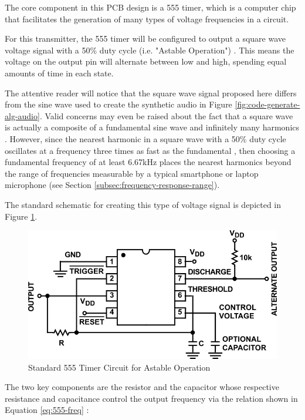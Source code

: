 The core component in this PCB design is a 555 timer, which is a
computer chip that facilitates the generation of many types of voltage
frequencies in a circuit.

For this transmitter, the 555 timer will be configured to output a
square wave voltage signal with a 50\% duty cycle (i.e. "Astable
Operation") \cite{icm7555}. This means the voltage on the output pin
will alternate between low and high, spending equal amounts of time in
each state.

The attentive reader will notice that the square wave signal proposed
here differs from the sine wave used to create the synthetic audio in
Figure \ref{fig:code-generate-alg-audio}. Valid concerns may even be
raised about the fact that a square wave is actually a composite of a
fundamental sine wave and infinitely many harmonics \cite{harmonics}.
However, since the nearest harmonic in a square wave with a 50\% duty
cycle oscillates at a frequency three times as fast as the fundamental
\cite{square-waves}, then choosing a fundamental frequency of at least
6.67kHz places the nearest harmonics beyond the range of frequencies
measurable by a typical smartphone or laptop microphone (see Section
\ref{subsec:frequency-response-range}).

The standard schematic for creating this type of voltage signal is
depicted in Figure \ref{fig:555_astable}.

\begin{figure}[h]
    \centering
    \caption{Standard 555 Timer Circuit for Astable Operation \cite{icm7555}}
    \label{fig:555_astable}
    \includegraphics[width=0.75\linewidth]{Figures/6 PCB Design/555_astable.png}
\end{figure}

The two key components are the resistor  and the capacitor
 whose respective resistance and capacitance control the output
frequency  via the relation shown in Equation \ref{eq:555-freq}
\cite{icm7555}:

